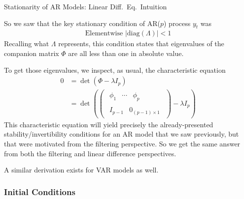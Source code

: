 \documentclass[aspectratio=169, handout]{beamer}
\newcommand{\diag}{\text{diag}}
\begin{document}
{\footnotesize
\begin{frame}{%
  Stationarity of AR Models: Linear Diff.\ Eq.\ Intuition
}

So we saw that the key \alert{stationary condition} of AR($p$) process
$y_t$ was
\begin{align*}
  \text{Elementwise $|\diag(\Lambda)|<1$}
\end{align*}
\pause
Recalling what $\Lambda$ represents, this condition states that
\alert{eigenvalues of the companion matrix $\Phi$} are all
\alert{less than one} in absolute value.

\pause
To get those eigenvalues, we inspect, as usual, the
\alert{characteristic equation}
\begin{align*}
  0
  &= \det(\Phi-\lambda I_p)
  \\
  &=
  \det\left(
    \begin{pmatrix}
      \begin{matrix}
        \phi_1 & \cdots & \phi_p
      \end{matrix}
      \\
      \begin{matrix}
        I_{p-1} & 0_{(p-1)\times 1}
      \end{matrix}
    \end{pmatrix}
    -
    \lambda I_p
  \right)
\end{align*}
This characteristic equation will yield precisely the already-presented
stability/invertibility conditions for an AR model that we saw
previously, but that were motivated from the filtering perspective.
So we get the \alert{same answer} from both the filtering and linear
difference perspectives.

\pause
A similar derivation exists for VAR models as well.
\end{frame}
}


\subsubsection{Initial Conditions}
\end{document}
